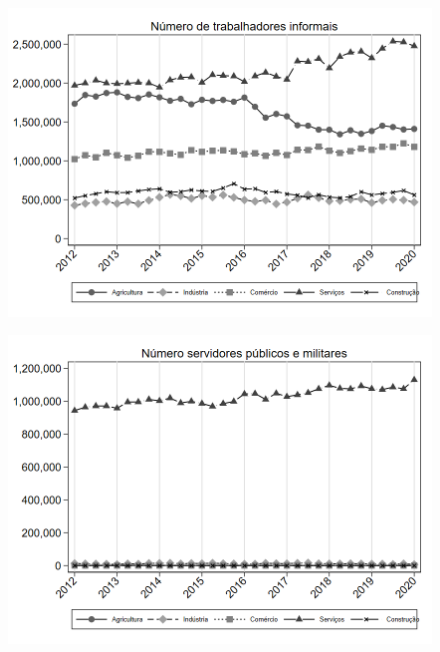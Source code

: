 \begin{frame}[label=_composicao_demografica_setor_n_de_informalidade]{}
\textit{\hyperlink{_composicao_demografica_setor}{}}
\begin{figure}
  \centering
  \includegraphics[width=1.0\linewidth]{../../analysis/output/composicao_demografica/setor/_composicao_demografica_setor_n_de_informalidade.png}
  \caption{}
  \label{fig:_composicao_demografica_setor_n_de_informalidade}
\end{figure}
\end{frame}


\begin{frame}[label=_composicao_demografica_setor_n_militar]{}
\textit{\hyperlink{_composicao_demografica_setor}{}}
\begin{figure}
  \centering
  \includegraphics[width=1.0\linewidth]{../../analysis/output/composicao_demografica/setor/_composicao_demografica_setor_n_militar.png}
  \caption{}
  \label{fig:_composicao_demografica_setor_n_militar}
\end{figure}
\end{frame}



